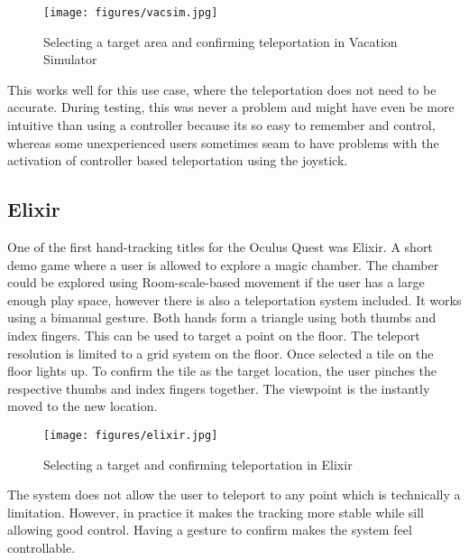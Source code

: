 \begin{figure}[htb]
  \centering
  \texttt{[image: figures/vacsim.jpg]}
  \caption{Selecting a target area and confirming teleportation in Vacation Simulator}
  \label{fig:pull}
\end{figure}

This works well for this use case, where the teleportation does not need to be accurate. During testing, this was never a problem and might have even be more intuitive than using a controller because its so easy to remember and control, whereas some unexperienced users sometimes seam to have problems with the activation of controller based teleportation using the joystick. 


\subsection{Elixir}
One of the first hand-tracking titles for the Oculus Quest was Elixir. A short demo game where a user is allowed to explore a magic chamber. The chamber could be explored using Room-scale-based movement if the user has a large enough play space, however there is also a teleportation system included. It works using a bimanual gesture. Both hands form a triangle using both thumbs and index fingers. This can be used to target a point on the floor. The teleport resolution is limited to a grid system on the floor. Once selected a tile on the floor lights up. To confirm the tile as the target location, the user pinches the respective thumbs and index fingers together. The viewpoint is the instantly moved to the new location.

\begin{figure}[htb]
  \centering
  \texttt{[image: figures/elixir.jpg]}
  \caption{Selecting a target and confirming teleportation in Elixir}
  \label{fig:elixir}
\end{figure}

The system does not allow the user to teleport to any point which is technically a limitation. However, in practice it makes the tracking more stable while sill allowing good control. Having a gesture to confirm makes the system feel controllable. 


